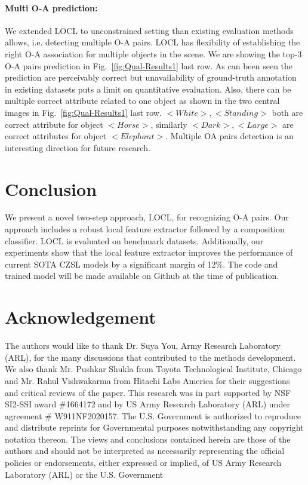 \documentclass{bmvc2k}
\begin{document}
\paragraph{Multi O-A prediction:}
We extended LOCL to unconstrained setting than existing evaluation methods allows, i.e. detecting multiple O-A pairs. LOCL has flexibility of establishing the right O-A association for multiple objects in the scene. We are showing the top-3 O-A pairs prediction in Fig.~\ref{fig:Qual-Results1} last row. As can been seen the prediction are perceivably correct but unavailability of ground-truth annotation in existing datasets puts a limit on quantitative evaluation. Also, there can be multiple correct attribute related to one object as shown in the two central images in Fig.~\ref{fig:Qual-Results1} last row. $<White>, <Standing>$ both are correct attribute for object $<Horse>$, similarly $<Dark>, <Large>$ are correct attributes for object $<Elephant>$. Multiple OA pairs detection is an interesting direction for future research.
 \vspace{-0.45cm}
\section{Conclusion}
\vspace{-0.2cm}
We present a novel two-step approach, LOCL, for recognizing O-A pairs. Our approach includes a robust local feature extractor followed by a composition classifier.
LOCL is evaluated on benchmark datasets. Additionally, our experiments show that the local feature extractor improves the performance of current SOTA CZSL models by a significant margin of 12\%. The code and trained model will be made available on Github at the time of publication.  












\section{Acknowledgement}
\vspace{-0.2cm}
The authors would like to thank Dr. Suya You, Army Research Laboratory (ARL), for the many discussions that contributed to the methods development. We also thank Mr. Pushkar Shukla from Toyota Technological Institute, Chicago and Mr. Rahul Vishwakarma from Hitachi Labs America for their suggestions and critical reviews of the paper. This research was in part supported by NSF SI2-SSI award \#1664172 and  by US Army Research Laboratory (ARL) under agreement \# W911NF2020157. The U.S. Government is authorized to reproduce and distribute reprints for Governmental purposes notwithstanding any copyright notation thereon. The views and conclusions contained herein are those of the authors and should not be interpreted as necessarily representing the official policies or endorsements, either expressed or implied, of US Army Research Laboratory (ARL) or the U.S. Government 
\end{document}
